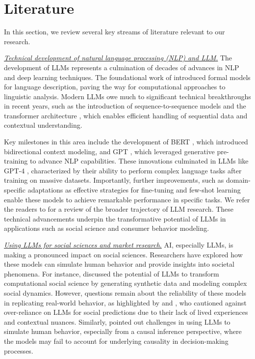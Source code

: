 \section{Literature}
\label{sec:literature}


In this section, we review several key streams of literature relevant to our research. 

\vspace{1mm}
\noindent
\underline{\textit{Technical development of natural language processing (NLP) and LLM}.}
The development of LLMs represents a culmination of decades of advances in NLP and deep learning techniques. The foundational work of \cite{chomsky1956three} introduced formal models for language description, paving the way for computational approaches to linguistic analysis. Modern LLMs owe much to significant technical breakthroughs in recent years, such as the introduction of sequence-to-sequence models \citep{sutskever2014sequence} and the transformer architecture \citep{vaswani2017attention}, which enables efficient handling of sequential data and contextual understanding.

Key milestones in this area include the development of BERT \citep{devlin2018bert}, which introduced bidirectional context modeling, and GPT \citep{radford2018improving}, which leveraged generative pre-training to advance NLP capabilities. These innovations culminated in LLMs like GPT-4 \citep{openai2023gpt}, characterized by their ability to perform complex language tasks after training on massive datasets.
Importantly, further improvements, such as domain-specific adaptations as effective strategies for fine-tuning \citep[e.g., see][]{beltagy2019scibert, gururangan2020don, parthasarathy2024ultimate} and few-shot learning \citep{brown2020language} enable these models to achieve remarkable performance in specific tasks.
We refer the readers to \cite{naveed2023comprehensive}
for a review of the broader trajectory of LLM research. These technical advancements underpin the transformative potential of LLMs in applications such as social science and consumer behavior modeling.

\vspace{1mm}
\noindent
\noindent
\underline{\textit{Using LLMs for social sciences and market research}.}
AI, especially LLMs, is making a pronounced impact on social sciences. Researchers have explored how these models can simulate human behavior and provide insights into societal phenomena. For instance, \cite{ziems2024can} discussed the potential of LLMs to transform computational social science by generating synthetic data and modeling complex social dynamics. However, questions remain about the reliability of these models in replicating real-world behavior, as highlighted by \cite{huang2024social} and \cite{yang2024large}, who cautioned against over-reliance on LLMs for social predictions due to their lack of lived experiences and contextual nuances. Similarly, \cite{gui2023challenge} pointed out challenges in using LLMs to simulate human behavior, especially from a causal inference perspective, where the models may fail to account for underlying causality in decision-making processes.

